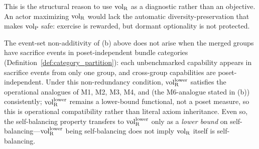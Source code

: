 This is the structural reason to use ${\operatorname{vol}_{\mathrm{R}}}$ as a diagnostic
rather than an objective.  An actor maximizing ${\operatorname{vol}_{\mathrm{R}}}$ would
lack the automatic diversity-preservation that makes ${\operatorname{vol}_{\mathrm{P}}}$
safe: exercise is rewarded, but dormant optionality is not
protected.

\begin{remark}
The event-set non-additivity of (b) above does not arise when
the merged groups have sacrifice events in poset-independent
bundle categories (Definition~\ref{def:category_partition}):
each unbenchmarked capability appears in sacrifice events from
only one group, and cross-group capabilities are
poset-independent.  Under this non-redundancy condition,
${\operatorname{vol}_{\mathrm{R}}^{\mathrm{lower}}}$ satisfies the operational analogues of M1, M2,
M3, M4, and (the M6-analogue stated in (b)) consistently;
${\operatorname{vol}_{\mathrm{R}}^{\mathrm{lower}}}$ remains a lower-bound functional, not a
poset measure, so this is operational compatibility rather
than literal axiom inheritance.  Even so, the self-balancing
property transfers to ${\operatorname{vol}_{\mathrm{R}}^{\mathrm{lower}}}$ only as a \emph{lower
bound} on self-balancing---${\operatorname{vol}_{\mathrm{R}}^{\mathrm{lower}}}$ being self-balancing
does not imply ${\operatorname{vol}_{\mathrm{R}}}$ itself is self-balancing.
\end{remark}
